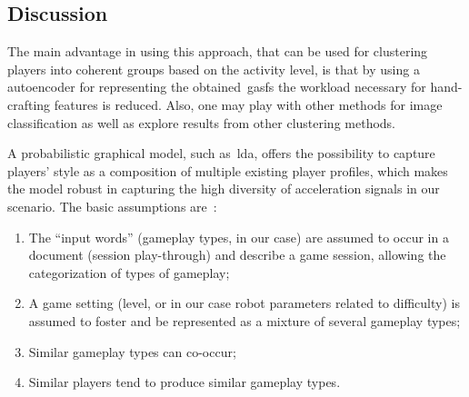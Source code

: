 \subsection{Discussion}
The main advantage in using this approach, that can be used for clustering players into coherent groups based on the activity level, is that by using a autoencoder for representing the obtained~\gls{gasf}s the workload necessary for hand-crafting features is reduced. Also, one may play with other methods for image classification  as well as explore results from other clustering methods.



A probabilistic graphical model, such as~\gls{lda}, offers the possibility to capture players' style as a composition of multiple existing player profiles, which makes the model robust in capturing the high diversity of acceleration signals in our scenario. The basic assumptions are~\citep{smith_mining_2016}:

\begin{enumerate}[label=\Alph*.]
\item The ``input words'' (gameplay types, in our case) are assumed to occur in a document (session play-through) and describe a game session, allowing the categorization of types of gameplay;
\item A game setting (level, or in our case robot parameters related to difficulty) is assumed to foster and be represented as a mixture of several gameplay types;
\item Similar gameplay types can co-occur;
\item Similar players tend to produce similar gameplay types.
\end{enumerate}

